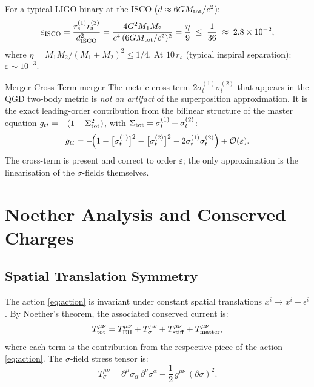 \documentclass[11pt,a4paper]{article}
\theoremstyle{definition}
\theoremstyle{remark}
\newcommand{\Sigt}{\Sigma_{\rm tot}}
\newcommand{\rs}[1]{r_{\rm s}^{(#1)}}
\newcommand{\crossterm}[2]{\sigma_{t}^{(#1)}\sigma_{t}^{(#2)}}
\newcommand{\sig}[2]{\sigma_{#1}^{(#2)}}
\begin{document}
	For a typical LIGO binary at the ISCO ($d\approx6GM_{\rm tot}/c^2$):
	\begin{equation}
		\varepsilon_{\rm ISCO}
		= \frac{\rs{1}\rs{2}}{d_{\rm ISCO}^2}
		= \frac{4G^2M_1M_2}{c^4\,(6GM_{\rm tot}/c^2)^2}
		= \frac{\eta}{9}
		\;\leq\;
		\frac{1}{36}
		\;\approx\; 2.8\times10^{-2},
		\label{eq:isco_bound}
	\end{equation}
	where $\eta=M_1M_2/(M_1+M_2)^2\leq1/4$.
	At $10\,r_s$ (typical inspiral separation):
	$\varepsilon\sim10^{-3}$.
	
	Merger Cross-Term merger
		The metric cross-term $2\crossterm{1}{2}$ that appears in the QGD
		two-body metric is \emph{not an artifact} of the superposition
		approximation.  It is the exact leading-order contribution from the
		bilinear structure of the master equation $g_{tt}=-(1-\Sigt^2)$,
		with $\Sigt=\sig{t}{1}+\sig{t}{2}$:
		\begin{equation}
			g_{tt}
			= -\!\Bigl(1 - \bigl[\sig{t}{1}\bigr]^2 - \bigl[\sig{t}{2}\bigr]^2
			- 2\crossterm{1}{2}\Bigr)
			+ \mathcal{O}(\varepsilon).
			\label{eq:gtt_exact}
		\end{equation}
		The cross-term is present and correct to order $\varepsilon$; the only
		approximation is the linearisation of the $\sigma$-fields themselves.
	
	\section{Noether Analysis and Conserved Charges}
	\label{sec:noether}
	
	\subsection{Spatial Translation Symmetry}
	
	The action \eqref{eq:action} is invariant under constant spatial
	translations $x^i\to x^i+\epsilon^i$.  By Noether's theorem, the
	associated conserved current is:
	\begin{equation}
		T^{\mu\nu}_{\rm tot}
		= T^{\mu\nu}_{\rm EH}
		+ T^{\mu\nu}_\sigma
		+ T^{\mu\nu}_{\rm stiff}
		+ T^{\mu\nu}_{\rm matter},
		\label{eq:T_total}
	\end{equation}
	where each term is the contribution from the respective piece of the
	action \eqref{eq:action}.  The $\sigma$-field stress tensor is:
	\begin{equation}
		T^{\mu\nu}_\sigma
		= \partial^\mu\sigma_\alpha\,\partial^\nu\sigma^\alpha
		- \frac{1}{2}\,g^{\mu\nu}\,(\partial\sigma)^2.
		\label{eq:T_sigma}
	\end{equation}
	
\end{document}
